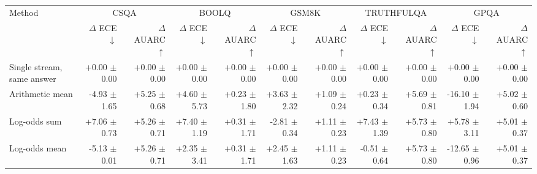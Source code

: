 \begin{tabular}{lrrrrrrrrrr}
\toprule
Method & \multicolumn{2}{c}{CSQA} & \multicolumn{2}{c}{BOOLQ} & \multicolumn{2}{c}{GSM8K} & \multicolumn{2}{c}{TRUTHFULQA} & \multicolumn{2}{c}{GPQA} \\
 & $\Delta$ ECE $\downarrow$ & $\Delta$ AUARC $\uparrow$ & $\Delta$ ECE $\downarrow$ & $\Delta$ AUARC $\uparrow$ & $\Delta$ ECE $\downarrow$ & $\Delta$ AUARC $\uparrow$ & $\Delta$ ECE $\downarrow$ & $\Delta$ AUARC $\uparrow$ & $\Delta$ ECE $\downarrow$ & $\Delta$ AUARC $\uparrow$ \\
\midrule
Single stream, same answer & +0.00 {\scriptsize $\pm$ 0.00} & +0.00 {\scriptsize $\pm$ 0.00} & +0.00 {\scriptsize $\pm$ 0.00} & +0.00 {\scriptsize $\pm$ 0.00} & +0.00 {\scriptsize $\pm$ 0.00} & +0.00 {\scriptsize $\pm$ 0.00} & +0.00 {\scriptsize $\pm$ 0.00} & +0.00 {\scriptsize $\pm$ 0.00} & +0.00 {\scriptsize $\pm$ 0.00} & +0.00 {\scriptsize $\pm$ 0.00} \\
Arithmetic mean & -4.93 {\scriptsize $\pm$ 1.65} & +5.25 {\scriptsize $\pm$ 0.68} & +4.60 {\scriptsize $\pm$ 5.73} & +0.23 {\scriptsize $\pm$ 1.80} & +3.63 {\scriptsize $\pm$ 2.32} & +1.09 {\scriptsize $\pm$ 0.24} & +0.23 {\scriptsize $\pm$ 0.34} & +5.69 {\scriptsize $\pm$ 0.81} & -16.10 {\scriptsize $\pm$ 1.94} & +5.02 {\scriptsize $\pm$ 0.60} \\
Log-odds sum & +7.06 {\scriptsize $\pm$ 0.73} & +5.26 {\scriptsize $\pm$ 0.71} & +7.40 {\scriptsize $\pm$ 1.19} & +0.31 {\scriptsize $\pm$ 1.71} & -2.81 {\scriptsize $\pm$ 0.34} & +1.11 {\scriptsize $\pm$ 0.23} & +7.43 {\scriptsize $\pm$ 1.39} & +5.73 {\scriptsize $\pm$ 0.80} & +5.78 {\scriptsize $\pm$ 3.11} & +5.01 {\scriptsize $\pm$ 0.37} \\
Log-odds mean & -5.13 {\scriptsize $\pm$ 0.01} & +5.26 {\scriptsize $\pm$ 0.71} & +2.35 {\scriptsize $\pm$ 3.41} & +0.31 {\scriptsize $\pm$ 1.71} & +2.45 {\scriptsize $\pm$ 1.63} & +1.11 {\scriptsize $\pm$ 0.23} & -0.51 {\scriptsize $\pm$ 0.64} & +5.73 {\scriptsize $\pm$ 0.80} & -12.65 {\scriptsize $\pm$ 0.96} & +5.01 {\scriptsize $\pm$ 0.37} \\

\end{tabular}
